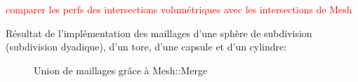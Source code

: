 \textcolor{red}{comparer les perfs des intersections volumétriques avec les intersections de Mesh}

Résultat de l'implémentation des maillages d'une sphère de subdivision (subdivision dyadique), d'un tore, d'une capsule et d'un cylindre:

\begin{figure}[h!]

	\caption{Union de maillages grâce à Mesh::Merge}
\end{figure}
\FloatBarrier
